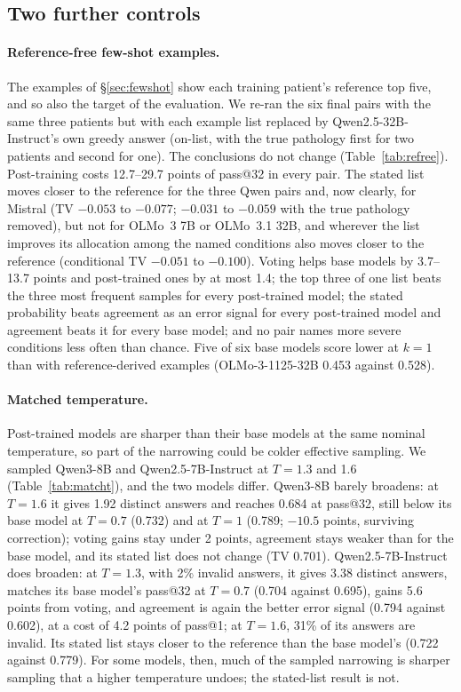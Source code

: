 \documentclass[wcp]{jmlr}
\begin{document}
\subsection{Two further controls}\label{sec:controls}
\paragraph{Reference-free few-shot examples.} The examples of \S\ref{sec:fewshot} show each training patient's reference top five, and so also the target of the evaluation. We re-ran the six final pairs with the same three patients but with each example list replaced by Qwen2.5-32B-Instruct's own greedy answer (on-list, with the true pathology first for two patients and second for one). The conclusions do not change (Table~\ref{tab:refree}). Post-training costs 12.7--29.7 points of pass@32 in every pair. The stated list moves closer to the reference for the three Qwen pairs and, now clearly, for Mistral (TV $-0.053$ to $-0.077$; $-0.031$ to $-0.059$ with the true pathology removed), but not for OLMo~3 7B or OLMo~3.1 32B, and wherever the list improves its allocation among the named conditions also moves closer to the reference (conditional TV $-0.051$ to $-0.100$). Voting helps base models by 3.7--13.7 points and post-trained ones by at most 1.4; the top three of one list beats the three most frequent samples for every post-trained model; the stated probability beats agreement as an error signal for every post-trained model and agreement beats it for every base model; and no pair names more severe conditions less often than chance. Five of six base models score lower at $k{=}1$ than with reference-derived examples (OLMo-3-1125-32B 0.453 against 0.528).

\paragraph{Matched temperature.} Post-trained models are sharper than their base models at the same nominal temperature, so part of the narrowing could be colder effective sampling. We sampled Qwen3-8B and Qwen2.5-7B-Instruct at $T{=}1.3$ and 1.6 (Table~\ref{tab:matcht}), and the two models differ. Qwen3-8B barely broadens: at $T{=}1.6$ it gives 1.92 distinct answers and reaches 0.684 at pass@32, still below its base model at $T{=}0.7$ (0.732) and at $T{=}1$ (0.789; $-10.5$ points, surviving correction); voting gains stay under 2 points, agreement stays weaker than for the base model, and its stated list does not change (TV 0.701). Qwen2.5-7B-Instruct does broaden: at $T{=}1.3$, with 2\% invalid answers, it gives 3.38 distinct answers, matches its base model's pass@32 at $T{=}0.7$ (0.704 against 0.695), gains 5.6 points from voting, and agreement is again the better error signal (0.794 against 0.602), at a cost of 4.2 points of pass@1; at $T{=}1.6$, 31\% of its answers are invalid. Its stated list stays closer to the reference than the base model's (0.722 against 0.779). For some models, then, much of the sampled narrowing is sharper sampling that a higher temperature undoes; the stated-list result is not.
\end{document}
